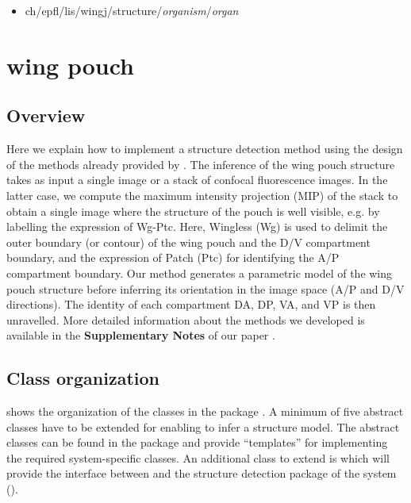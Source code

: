 \begin{itemize}
 \item ch/epfl/lis/wingj/structure/\textit{organism}/\textit{organ}
\end{itemize}



\section{\droso wing pouch}\label{sec:wing_pouch_structure_detection}
\subsection{Overview}
Here we explain how to implement a structure detection method using the design of the methods already provided by \wingj. The inference of the \droso wing pouch structure takes as input a single image or a stack of confocal fluorescence images. In the latter case, we compute the maximum intensity projection (MIP) of the stack to obtain a single image where the structure of the pouch is well visible, e.g. by labelling the expression of Wg-Ptc. Here, Wingless (Wg) is used to delimit the outer boundary (or contour) of the wing pouch and the D/V compartment boundary, and the expression of Patch (Ptc) for identifying the A/P compartment boundary. Our method generates a parametric model of the wing pouch structure before inferring its orientation in the image space (A/P and D/V directions). The identity of each compartment DA, DP, VA, and VP is then unravelled. More detailed information about the methods we developed is available in the \textbf{Supplementary Notes} of our paper \autocite{schaffter2013}.

\subsection{Class organization}
 shows the organization of the classes in the package \wingpouchPkg. A minimum of five abstract classes have to be extended for enabling \wingj to infer a structure model. The abstract classes can be found in the package \structurePkg and provide ``templates'' for implementing the required system-specific classes. An additional class to extend is \WJSystem which will provide the interface between \wingj and the structure detection package of the system ().

